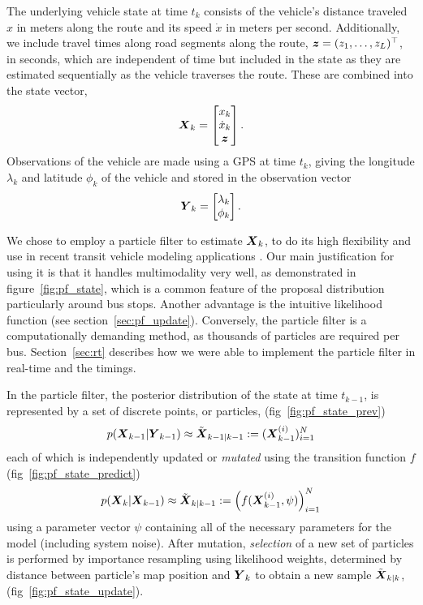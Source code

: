The underlying vehicle state at time $t_k$ consists of
the vehicle's distance traveled $x$ in meters along the route and
its speed $\dot x$ in meters per second.
Additionally, we include travel times along road segments along the route, 
$\boldsymbol{z} = (z_1,\ldots,z_L)^\top$, in seconds,
which are independent of time but included in the state as they are estimated
sequentially as the vehicle traverses the route.
These are combined into the state vector,
\begin{equation}
\label{eq:vehicle_state}
\mbox{$\boldsymbol{X}$}_k = 
\begin{bmatrix}
    x_k \\ \dot x_k \\ \boldsymbol{z}
\end{bmatrix}.
\end{equation}
Observations of the vehicle are made using a GPS at time $t_k$,
giving the longitude $\lambda_k$ and latitude $\phi_k$ of the vehicle
and stored in the observation vector
\begin{equation}
\label{eq:vehicle_obs}
\mbox{$\boldsymbol{Y}$}_k = \begin{bmatrix} \lambda_k \\ \phi_k \end{bmatrix}.
\end{equation}


We chose to employ a particle filter to estimate $\mbox{$\boldsymbol{X}$}_k$,
to do its high flexibility and use in recent 
transit vehicle modeling applications \citep{Hans_2015}.
Our main justification for using it is that it handles multimodality very well,
as demonstrated in figure~\ref{fig:pf_state},
which is a common feature of the proposal distribution particularly around bus stops.
Another advantage is the intuitive likelihood function (see section~\ref{sec:pf_update}).
Conversely, the particle filter is a computationally demanding method,
as thousands of particles are required per bus.
Section~\ref{sec:rt} describes how we were able to implement the particle filter in real-time and the timings.


In the particle filter, the posterior distribution of the state at time $t_{k-1}$,
is represented by a set of discrete points, or particles, (fig~\ref{fig:pf_state_prev})
\begin{equation}
p(\mbox{$\boldsymbol{X}$}_{k-1} | \mbox{$\boldsymbol{Y}$}_{k-1}) \approx \tilde{\mbox{$\boldsymbol{X}$}}_{k-1|k-1} := (\mbox{$\boldsymbol{X}$}_{k-1}^{(i)})_{i=1}^N
\end{equation}
each of which is independently updated or \emph{mutated} using the transition function $f$ (fig~\ref{fig:pf_state_predict})
\begin{equation}
p(\mbox{$\boldsymbol{X}$}_k | \mbox{$\boldsymbol{X}$}_{k-1}) \approx \tilde{\mbox{$\boldsymbol{X}$}}_{k|k-1} := 
\left(f(\mbox{$\boldsymbol{X}$}_{k-1}^{(i)}, \psi)\right)_{i=1}^N
\end{equation}
using a parameter vector $\psi$ containing all of the necessary parameters
for the model (including system noise).
After mutation, \emph{selection} of a new set of particles is performed by
importance resampling using likelihood weights,
determined by distance between particle's map position and $\mbox{$\boldsymbol{Y}$}_k$ 
to obtain a new sample $\tilde{\mbox{$\boldsymbol{X}$}}_{k|k}$, (fig~\ref{fig:pf_state_update}).



